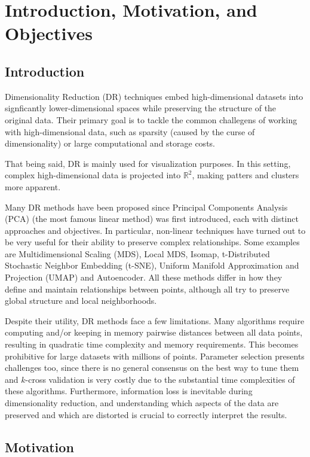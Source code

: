 \section{Introduction, Motivation, and Objectives}

\subsection{Introduction}

Dimensionality Reduction (DR) techniques embed high-dimensional datasets into signficantly lower-dimensional spaces while preserving the structure of the original data. Their primary goal is to tackle the common challegens of working with high-dimensional data, such as sparsity (caused by the curse of dimensionality) or large computational and storage costs.

That being said, DR is mainly used for visualization purposes. In this setting, complex high-dimensional data is projected into $\mathbb{R}^2$, making patters and clusters more apparent.

Many DR methods have been proposed since Principal Components Analysis (PCA) (the most famous linear method) was first introduced, each with distinct approaches and objectives. In particular, non-linear techniques have turned out to be very useful for their ability to preserve complex relationships. Some examples are Multidimensional Scaling (MDS), Local MDS, Isomap, t-Distributed Stochastic Neighbor Embedding (t-SNE), Uniform Manifold Approximation and Projection (UMAP) and Autoencoder. All these methods differ in how they define and maintain relationships between points, although all try to preserve global structure and local neighborhoods.

Despite their utility, DR methods face a few limitations. Many algorithms require computing and/or keeping in memory pairwise distances between all data points, resulting in quadratic time complexity and memory requirements. This becomes prohibitive for large datasets with millions of points. Parameter selection presents challenges too, since there is no general consensus on the best way to tune them and $k$-cross validation is very costly due to the substantial time complexities of these algorithms. Furthermore, information loss is inevitable during dimensionality reduction, and understanding which aspects of the data are preserved and which are distorted is crucial to correctly interpret the results.

\subsection{Motivation}


